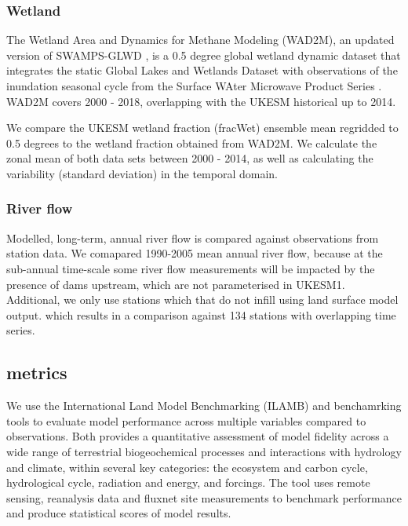 \subsubsection{Wetland}
The Wetland Area and Dynamics for Methane Modeling (WAD2M), an updated version of SWAMPS-GLWD \citep{Poulter2017-cx}, is a 0.5 degree global wetland dynamic dataset that integrates the static Global Lakes and Wetlands Dataset \citep{Lehner2004-rm} with observations of the inundation seasonal cycle from the Surface WAter Microwave Product Series \citep{Schroeder2015-ai}. WAD2M covers 2000 - 2018, overlapping with the UKESM historical up to 2014.

We compare the UKESM wetland fraction (fracWet) ensemble mean regridded to 0.5 degrees to the wetland fraction obtained from WAD2M. We calculate the zonal mean of both data sets between 2000 - 2014, as well as calculating the variability (standard deviation) in the temporal domain.


\subsubsection{River flow}
Modelled, long-term, annual river flow is compared against observations from \citet{Dai2009} station data. We comapared 1990-2005 mean annual river flow, because at the sub-annual time-scale some river flow measurements will be impacted by the presence of dams upstream, which are not parameterised in UKESM1. Additional, we only use stations which that do not infill using land surface model output. which results in a comparison against 134 stations with overlapping time series. 

\subsection{metrics}
We use the International Land Model Benchmarking (ILAMB) \citep{Collier2018-ai} and   \citet{Kelley2013-ey, rabin2017fire} benchamrking tools to evaluate model performance across multiple variables compared to observations. Both provides a quantitative assessment of model fidelity across a wide range of terrestrial biogeochemical processes and interactions with hydrology and climate, within several key categories: the ecosystem and carbon cycle, hydrological cycle, radiation and energy, and forcings. The tool uses remote sensing, reanalysis data and fluxnet site measurements to benchmark performance and produce statistical scores of model results. 


